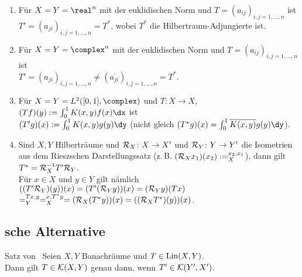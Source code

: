 \begin{Bsp}
    \begin{enumerate}[label=\emph{(\alph*)}]
        \item
        Für $X = Y = \real^n$ mit der euklidischen Norm und
        $T = (a_{ij})_{i,j=1,\dotsc,n}$ ist\\
        $T' = (a_{ji})_{i,j=1,\dotsc,n} = T^\ast$,
        wobei $T^\ast$ die Hilbertraum-Adjungierte ist.

        \item
        Für $X = Y = \complex^n$ mit der euklidischen Norm und
        $T = (a_{ij})_{i,j=1,\dotsc,n}$ ist\\
        $T' = (a_{ji})_{i,j=1,\dotsc,n} \not= (\overline{a_{ji}})_{i,j=1,\dotsc,n} = T^\ast$.

        \item
        Für $X = Y = L^2([0,1], \complex)$ und
        $T\colon X \rightarrow X$,
        $(Tf)(y) := \int_0^1 K(x, y)f(x)\dx$ ist\\
        $(T'g)(x) := \int_0^1 K(x, y)g(y)\dy$
        (nicht gleich
        $(T^\ast g)(x) = \int_0^1 \overline{K(x, y)} g(y) \dy$).

        \item
        Sind $X, Y$ Hilberträume und $\mathcal{R}_X\colon X \rightarrow X'$ und
        $\mathcal{R}_Y\colon Y \rightarrow Y'$ die Isometrien aus dem Rieszschen Darstellungssatz
        (z.\,B. $(\mathcal{R}_X x_1)(x_2) := \sp{x_2, x_1}_X$),
        dann gilt $T^\ast = \mathcal{R}_X^{-1} T' \mathcal{R}_Y$.\\
        Für $x \in X$ und $y \in Y$ gilt nämlich
        $((T' \mathcal{R}_Y)(y))(x)
        = (T'(\mathcal{R}_Y y))(x)
        = (\mathcal{R}_Y y)(Tx)$\\
        $= \sp{Tx, y}_Y
        = \sp{x, T^\ast y}_X
        = (\mathcal{R}_X (T^\ast y))(x)
        = ((\mathcal{R}_X T^\ast)(y))(x)$.
    \end{enumerate}
\end{Bsp}

\pagebreak

\subsection{%
    sche Alternative%
}

\begin{Satz}{Satz von \scshape\,\!}
    Seien $X, Y$ Banachräume und $T \in \operatorname{Lin}(X, Y)$.\\
    Dann gilt $T \in \mathcal{K}(X, Y)$ genau dann, wenn $T' \in \mathcal{K}(Y', X')$.
\end{Satz}

